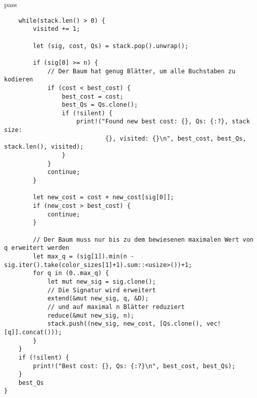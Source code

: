 pass\documentclass[a4paper,10pt,ngerman]{scrartcl}
\begin{document}
\begin{verbatim}
    while(stack.len() > 0) {
        visited += 1;

        let (sig, cost, Qs) = stack.pop().unwrap();

        if (sig[0] >= n) {
            // Der Baum hat genug Blätter, um alle Buchstaben zu kodieren
            if (cost < best_cost) {
                best_cost = cost;
                best_Qs = Qs.clone();
                if (!silent) {
                    print!("Found new best cost: {}, Qs: {:?}, stack size:
                            {}, visited: {}\n", best_cost, best_Qs, stack.len(), visited);
                }
            }
            continue;
        }

        let new_cost = cost + new_cost[sig[0]];
        if (new_cost > best_cost) {
            continue;
        }

        // Der Baum muss nur bis zu dem bewiesenen maximalen Wert von q erweitert werden
        let max_q = (sig[1]).min(n - sig.iter().take(color_sizes[1]+1).sum::<usize>())+1;
        for q in (0..max_q) {
            let mut new_sig = sig.clone();
            // Die Signatur wird erweitert
            extend(&mut new_sig, q, &D);
            // und auf maximal n Blätter reduziert
            reduce(&mut new_sig, n);
            stack.push((new_sig, new_cost, [Qs.clone(), vec![q]].concat()));
        }
    }
    if (!silent) {
        print!("Best cost: {}, Qs: {:?}\n", best_cost, best_Qs);
    }
    best_Qs
}
    \end{verbatim}
\end{document}
